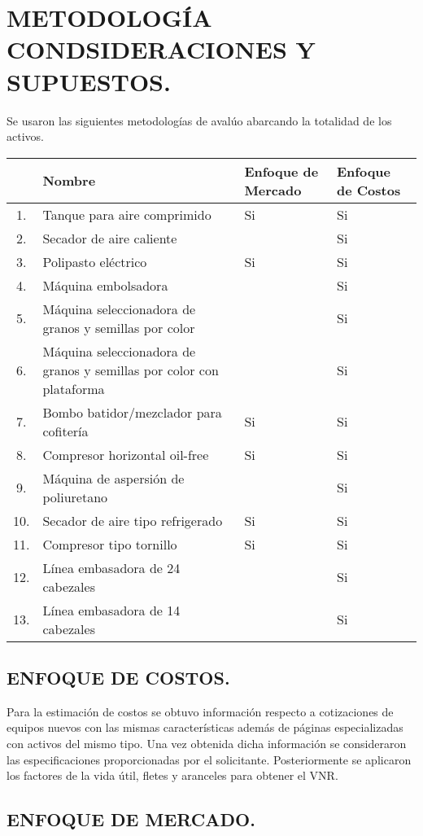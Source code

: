 
\chapter{METODOLOGÍA CONDSIDERACIONES Y SUPUESTOS.} %

Se usaron las siguientes metodologías de avalúo abarcando la totalidad de los
activos.

\begin{tabular}{|cp{7cm}|p{2cm}|p{2cm}|}
	\hline 
  	& Nombre & Enfoque de Mercado & Enfoque de Costos \\ \hline 
	1. & Tanque para aire comprimido & Si & Si \\ \hline
	2. & Secador de aire caliente & & Si \\ \hline
	3. & Polipasto eléctrico & Si & Si \\ \hline
	4. & Máquina embolsadora & & Si \\ \hline
	5. & Máquina seleccionadora de granos y semillas por color & & Si \\ \hline
	6. & Máquina seleccionadora de granos y semillas por color con plataforma & & Si \\ \hline
	7. & Bombo batidor/mezclador para cofitería & Si & Si \\ \hline
	8. & Compresor horizontal oil-free & Si & Si \\ \hline
	9. & Máquina de aspersión de poliuretano & & Si \\ \hline
	10. & Secador de aire tipo refrigerado & Si & Si \\ \hline
	11. & Compresor tipo tornillo & Si & Si \\ \hline
	12. & Línea embasadora de 24 cabezales & & Si \\ \hline
	13. & Línea embasadora de 14 cabezales & & Si \\ \hline
\end{tabular}

\section{ENFOQUE DE COSTOS.} %
Para la estimación de costos se  obtuvo información  respecto a cotizaciones de equipos nuevos con las mismas características además de páginas especializadas con activos del mismo tipo. Una vez obtenida  dicha información se consideraron las especificaciones proporcionadas por el solicitante.
Posteriormente se aplicaron los factores de la vida útil, fletes y aranceles para obtener el VNR.

\section{ENFOQUE DE MERCADO.} %

